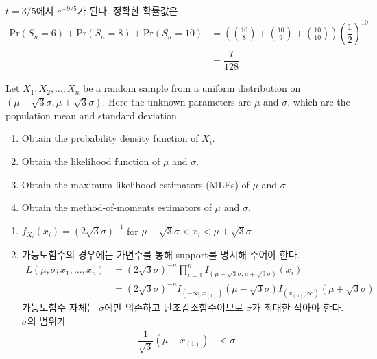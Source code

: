 \documentclass[answers]{exam}
\begin{document}
\begin{questions}
\begin{solution}
\begin{enumerate}
      $t=3/5$에서 $e^{-9/5}$가 된다. 정확한 확률값은
      \begin{align}
        \mathrm{Pr}\left(S_{n}=6\right)+\mathrm{Pr}\left(S_{n}=8\right)+\mathrm{Pr}\left(S_{n}=10\right) &= \left({{10}\choose{8}}+{{10}\choose{9}}+{{10}\choose{10}}\right) \left(\dfrac{1}{2}\right)^{10}\\
        &= \dfrac{7}{128}
      \end{align}
    \end{enumerate}
   \end{solution}
   \question
   Let $X_{1},X_{2},\ldots, X_{n}$ be a random sample from a uniform distribution on $\left(\mu-\sqrt{3}\sigma,\mu+\sqrt{3}\sigma\right)$. Here the unknown parameters are $\mu$ and $\sigma$, which are the population mean and standard deviation.
   \begin{enumerate}
    \item Obtain the probability density function of $X_{i}$.
    \item Obtain the likelihood function of $\mu$ and $\sigma$.
    \item Obtain the maximum-likelihood estimators (MLEs) of $\mu$ and $\sigma$.
    \item Obtain the method-of-moments estimators of $\mu$ and $\sigma$.
   \end{enumerate}
   \begin{solution}
    \begin{enumerate}
      \item $f_{X_{i}}\left(x_{i}\right) = \left(2\sqrt{3}\sigma\right)^{-1}$ for $\mu-\sqrt{3}\sigma < x_{i}<\mu+\sqrt{3}\sigma$
      \item 가능도함수의 경우에는 가변수를 통해 support를 명시해 주어야 한다.
      \begin{align}
      L\left(\mu,\sigma;x_{1},\ldots,x_{n}\right)&=\left(2\sqrt{3}\sigma\right)^{-n}\prod_{i=1}^{n}I_{\left(\mu-\sqrt{3}\sigma,\mu+\sqrt{3}\sigma \right)}\left(x_{i}\right)\\
      &= \left(2\sqrt{3}\sigma\right)^{-n} I_{\left(-\infty,x_{\left(1\right)}\right)}\left(\mu-\sqrt{3}\sigma\right)I_{\left(x_{\left(n\right)},\infty\right)}\left(\mu+\sqrt{3}\sigma\right)
      \end{align}
      가능도함수 자체는 $\sigma$에만 의존하고 단조감소함수이므로 $\sigma$가 최대한 작아야 한다. $\sigma$의 범위가
      \begin{align}
        \dfrac{1}{\sqrt{3}}\left(\mu-x_{\left(1\right)}\right) &< \sigma\\

\end{align}
\end{enumerate}
\end{solution}
\end{questions}
\end{document}
